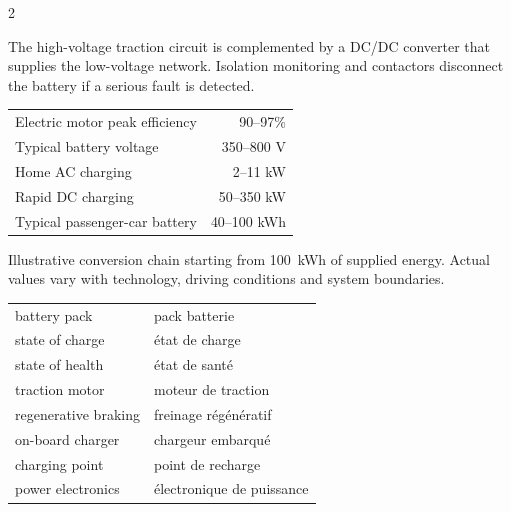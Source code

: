 \begin{multicols}{2}
\begin{engineeringfocus}
The high-voltage traction circuit is complemented by a DC/DC converter that supplies the low-voltage network. Isolation monitoring and contactors disconnect the battery if a serious fault is detected.
\end{engineeringfocus}

\begin{keyfigures}
\begin{tabularx}{\linewidth}{@{}Xr@{}}
Electric motor peak efficiency & 90--97\%\\
Typical battery voltage & 350--800 V\\
Home AC charging & 2--11 kW\\
Rapid DC charging & 50--350 kW\\
Typical passenger-car battery & 40--100 kWh
\end{tabularx}
\end{keyfigures}

\begin{tcolorbox}[title=\sffamily\bfseries From supplied energy to the wheels,colback=white,colframe=ECBlue]
\begin{center}
\end{center}
\footnotesize Illustrative conversion chain starting from 100~kWh of supplied energy. Actual values vary with technology, driving conditions and system boundaries.
\end{tcolorbox}

\begin{vocabulary}
\begin{tabularx}{\linewidth}{@{}lX@{}}
battery pack & pack batterie\\
state of charge & état de charge\\
state of health & état de santé\\
traction motor & moteur de traction\\
regenerative braking & freinage régénératif\\
on-board charger & chargeur embarqué\\
charging point & point de recharge\\
power electronics & électronique de puissance
\end{tabularx}
\end{vocabulary}


\end{multicols}
